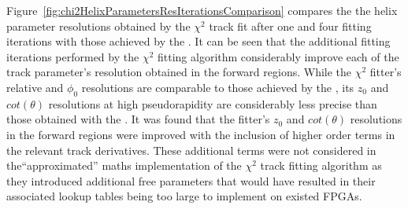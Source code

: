 Figure~\ref{fig:chi2HelixParametersResIterationsComparison} compares the the helix parameter resolutions obtained by the $\chi^{2}$ track fit after one and four fitting iterations with those achieved by the \KF.
It can be seen that the additional fitting iterations performed by the $\chi^{2}$ fitting algorithm considerably improve each of the track parameter's resolution obtained in the forward regions.
While the $\chi^{2}$ fitter's \pt relative and $\phi_{0}$ resolutions are comparable to those achieved by the \KF, its $z_{0}$ and $cot(\theta)$ resolutions at high pseudorapidity are considerably less precise than those obtained with the \KF.
It was found that the \KF fitter's $z_{0}$ and $cot(\theta)$ resolutions in the forward regions were improved with the inclusion of higher order terms in the relevant track derivatives.
These additional terms were not considered in the``approximated'' maths implementation of the $\chi^{2}$ track fitting algorithm as they introduced additional free parameters that would have resulted in their associated lookup tables being too large to implement on existed FPGAs.

